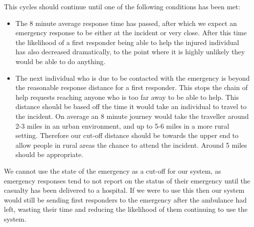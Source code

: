 \documentclass{article}
\begin{document}
This cycles should continue until one of the following conditions has been met:
\begin{itemize}
\item The 8 minute average response time has passed, after which we expect an emergency response to be either at the incident or very close. After this time the likelihood of a first responder being able to help the injured individual has also decreased dramatically, to the point where it is highly unlikely they would be able to do anything.
\item The next individual who is due to be contacted with the emergency is beyond the reasonable response distance for a first responder. This stops the chain of help requests reaching anyone who is too far away to be able to help. This distance should be based off the time it would take an individual to travel to the incident. On average an 8 minute journey would take the traveller around 2-3 miles in an urban environment, and up to 5-6 miles in a more rural setting. Therefore our cut-off distance should be towards the upper end to allow people in rural areas the chance to attend the incident. Around 5 miles should be appropriate.
\end{itemize}
We cannot use the state of the emergency as a cut-off for our system, as emergency responses tend to not report on the status of their emergency until the casualty has been delivered to a hospital. If we were to use this then our system would still be sending first responders to the emergency after the ambulance had left, wasting their time and reducing the likelihood of them continuing to use the system.\\
\end{document}
